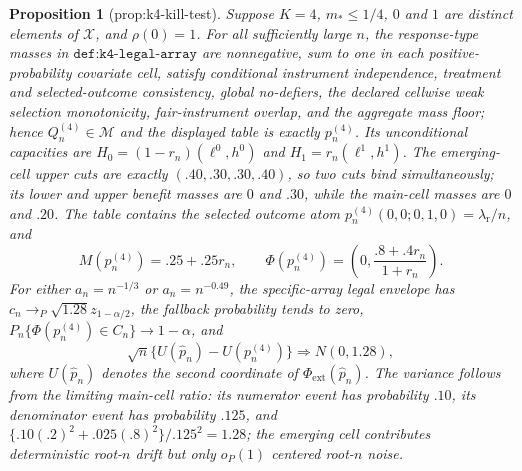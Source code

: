 \documentclass{article}
\newtheorem{proposition}{Proposition}
\begin{document}
\begin{proposition}[prop:k4-kill-test]\label{prop:k4-kill-test}
Suppose \(K=4\), \(m_*\le1/4\), \(0\) and \(1\) are distinct elements of \(\mathcal X\), and \(\rho(0)=1\). For all sufficiently large \(n\), the response-type masses in \(\texttt{def:k4-legal-array}\) are nonnegative, sum to one in each positive-probability covariate cell, satisfy conditional instrument independence, treatment and selected-outcome consistency, global no-defiers, the declared cellwise weak selection monotonicity, fair-instrument overlap, and the aggregate mass floor; hence \(Q_n^{(4)}\in\mathcal M\) and the displayed table is exactly \(p_n^{(4)}\). Its unconditional capacities are \(H_0=(1-r_n)(\ell^0,h^0)\) and \(H_1=r_n(\ell^1,h^1)\). The emerging-cell upper cuts are exactly \((.40,.30,.30,.40)\), so two cuts bind simultaneously; its lower and upper benefit masses are \(0\) and \(.30\), while the main-cell masses are \(0\) and \(.20\). The table contains the selected outcome atom \(p_n^{(4)}(0,0;0,1,0)=\lambda_{\mathrm r}/n\), and \[M(p_n^{(4)})=.25+.25r_n,\qquad \Phi(p_n^{(4)})=\left(0,\frac{.8+.4r_n}{1+r_n}\right).\] For either \(a_n=n^{-1/3}\) or \(a_n=n^{-0.49}\), the specific-array legal envelope has \(c_n\to_P\sqrt{1.28}z_{1-\alpha/2}\), the fallback probability tends to zero, \(P_n\{\Phi(p_n^{(4)})\in C_n\}\to1-\alpha\), and \[\sqrt n\{U(\widehat p_n)-U(p_n^{(4)})\}\Rightarrow N(0,1.28),\] where \(U(\widehat p_n)\) denotes the second coordinate of \(\Phi_{\mathrm{ext}}(\widehat p_n)\). The variance follows from the limiting main-cell ratio: its numerator event has probability \(.10\), its denominator event has probability \(.125\), and \(\{.10(.2)^2+.025(.8)^2\}/.125^2=1.28\); the emerging cell contributes deterministic root-\(n\) drift but only \(o_P(1)\) centered root-\(n\) noise.
\end{proposition}
\end{document}
